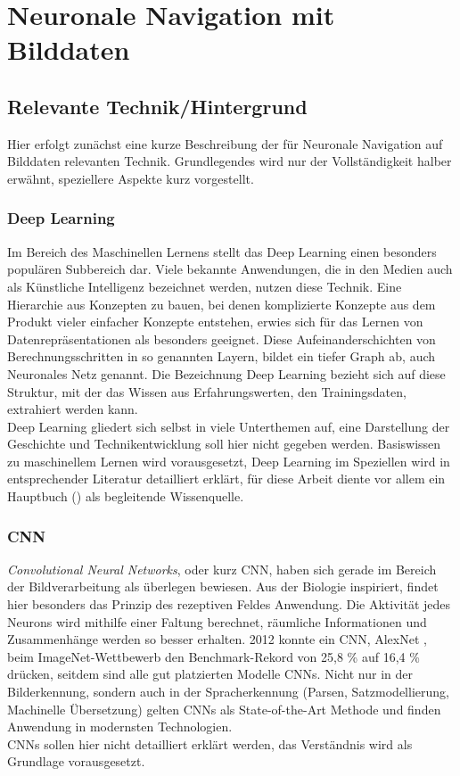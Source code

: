 
%
\chapter{Neuronale Navigation mit Bilddaten}

\section{Relevante Technik/Hintergrund}
Hier erfolgt zunächst eine kurze Beschreibung der für Neuronale Navigation auf Bilddaten relevanten Technik. Grundlegendes wird nur der Vollständigkeit halber erwähnt, speziellere Aspekte kurz vorgestellt. 

\subsection{Deep Learning}
Im Bereich des Maschinellen Lernens stellt das Deep Learning einen besonders populären Subbereich dar. Viele bekannte Anwendungen, die in den Medien auch als Künstliche Intelligenz bezeichnet werden, nutzen diese Technik. Eine Hierarchie aus Konzepten zu bauen, bei denen komplizierte Konzepte aus dem Produkt vieler einfacher Konzepte entstehen, erwies sich für das Lernen von Datenrepräsentationen als besonders geeignet. Diese Aufeinanderschichten von Berechnungsschritten in so genannten Layern, bildet ein tiefer Graph ab, auch Neuronales Netz genannt. Die Bezeichnung Deep Learning bezieht sich auf diese Struktur, mit der das Wissen aus Erfahrungswerten, den Trainingsdaten, extrahiert werden kann.\\
Deep Learning gliedert sich selbst in viele Unterthemen auf, eine Darstellung der Geschichte und Technikentwicklung soll hier nicht gegeben werden. Basiswissen zu maschinellem Lernen wird vorausgesetzt, Deep Learning im Speziellen wird in entsprechender Literatur detailliert erklärt, für diese Arbeit diente vor allem ein Hauptbuch (\cite{Goodfellow-et-al-2016}) als begleitende Wissenquelle.


\subsection{CNN}
\textit{Convolutional Neural Networks}, oder kurz CNN, haben sich gerade im Bereich der Bildverarbeitung als überlegen bewiesen. Aus der Biologie inspiriert, findet hier besonders das Prinzip des rezeptiven Feldes Anwendung. Die Aktivität jedes Neurons wird mithilfe einer Faltung berechnet, räumliche Informationen und Zusammenhänge werden so besser erhalten. 2012 konnte ein CNN, AlexNet \cite{krizhevsky2012imagenet}, beim ImageNet-Wettbewerb den Benchmark-Rekord von 25,8 \% auf 16,4 \% drücken, seitdem sind alle gut platzierten Modelle CNNs. Nicht nur in der Bilderkennung, sondern auch in der Spracherkennung (Parsen, Satzmodellierung, Machinelle Übersetzung) gelten CNNs als State-of-the-Art Methode und finden Anwendung in modernsten Technologien.\\
CNNs sollen hier nicht detailliert erklärt werden, das Verständnis wird als Grundlage vorausgesetzt.

